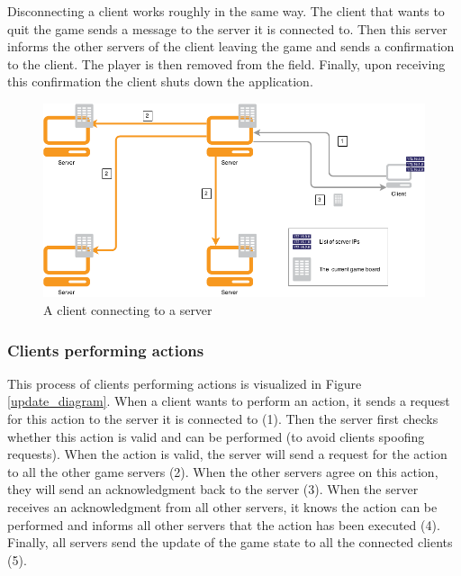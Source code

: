Disconnecting a client works roughly in the same way. The client that wants to quit the game sends a message to the server it is connected to. Then this server informs the other servers of the client leaving the game and sends a confirmation to the client. The player is then removed from the field. Finally, upon receiving this confirmation the client shuts down the application.

\begin{figure}[h!]
  \centering
    \includegraphics[width=\textwidth]{diagrams/connecting-client}
    
  \caption{A client connecting to a server}
  \label{connect_diagram}
\end{figure}

\subsubsection{Clients performing actions}
\label{sec:clients_actions}
This process of clients performing actions is visualized in Figure \ref{update_diagram}. When a client wants to perform an action, it sends a request for this action to the server it is connected to (1). Then the server first checks whether this action is valid and can be performed (to avoid clients spoofing requests). When the action is valid, the server will send a request for the action to all the other game servers (2). When the other servers agree on this action, they will send an acknowledgment back to the server (3). When the server receives an acknowledgment from all other servers, it knows the action can be performed and informs all other servers that the action has been executed (4). Finally, all servers send the update of the game state to all the connected clients (5).

